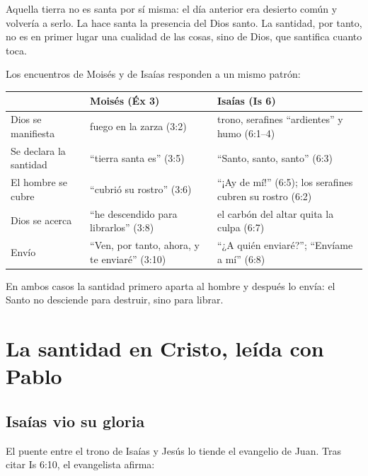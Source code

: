 Aquella tierra no es santa por sí misma: el día anterior era desierto común y volvería a serlo. La hace santa la presencia del Dios santo. La santidad, por tanto, no es en primer lugar una cualidad de las cosas, sino de Dios, que santifica cuanto toca.


Los encuentros de Moisés y de Isaías responden a un mismo patrón:

\begin{center}\small\renewcommand{\arraystretch}{1.3}
\begin{tabular}{@{}L{3.0cm}L{5.6cm}L{5.6cm}@{}}
\toprule
& \textbf{Moisés (Éx 3)} & \textbf{Isaías (Is 6)} \\ \midrule
Dios se manifiesta & fuego en la zarza (3:2) & trono, serafines ``ardientes'' y humo (6:1--4) \\
Se declara la santidad & ``tierra santa es'' (3:5) & ``Santo, santo, santo'' (6:3) \\
El hombre se cubre & ``cubrió su rostro'' (3:6) & ``¡Ay de mí!'' (6:5); los serafines cubren su rostro (6:2) \\
Dios se acerca & ``he descendido para librarlos'' (3:8) & el carbón del altar quita la culpa (6:7) \\
Envío & ``Ven, por tanto, ahora, y te enviaré'' (3:10) & ``¿A quién enviaré?''; ``Envíame a mí'' (6:8) \\
\bottomrule
\end{tabular}\end{center}


En ambos casos la santidad primero aparta al hombre y después lo envía: el Santo no desciende para destruir, sino para librar.

\section{La santidad en Cristo, leída con Pablo}

\subsection{Isaías vio su gloria}
El puente entre el trono de Isaías y Jesús lo tiende el evangelio de Juan. Tras citar Is 6:10, el evangelista afirma:

